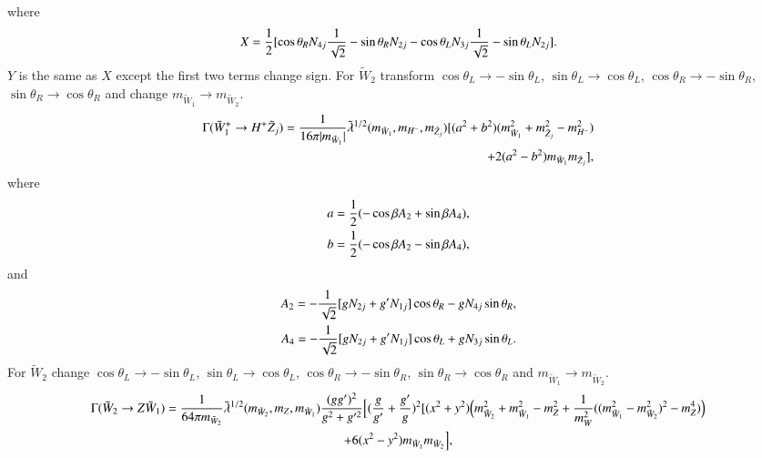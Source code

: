 \documentclass[final,3p,times]{elsarticle}
\begin{document}
where
\begin{equation}
\begin{aligned}
X = {1 \over 2} [\cos\theta_R N_{4j} {1 \over \sqrt{2}} - \sin\theta_R N_{2j} - \cos\theta_L N_{3j} {1 \over \sqrt{2}} - \sin\theta_L N_{2j}].
\end{aligned}
\end{equation}
$Y$ is the same as $X$ except the first two terms change sign.
For $\tilde{W}_2$ transform $\cos\theta_L \rightarrow -\sin\theta_L$, $\sin\theta_L \rightarrow \cos\theta_L$, $\cos\theta_R \rightarrow -\sin\theta_R$, $\sin\theta_R \rightarrow \cos\theta_R$ and change $m_{\tilde{W}_{1}} \rightarrow m_{\tilde{W}_2}$.
\begin{equation}\label{ch1Hpmneut}
\begin{aligned}
\Gamma (\tilde{W}_1^+ \rightarrow H^+ \tilde{Z}_j) = {1 \over 16\pi|m_{\tilde{W}_1}| } \tilde{\lambda}^{1/2} (m_{\tilde{W}_1}, m_{H^-}, m_{\tilde{Z}_j}) [(a^2 + b^2)(m_{\tilde{W}_{1}}^2 + m_{\tilde{Z}_{j}}^2 - m_{H^-}^2) \\ + 2(a^2 - b^2)m_{\tilde{W}_{1}}m_{\tilde{Z}_{j}}],
\end{aligned}
\end{equation} 
where
\begin{equation}
\begin{aligned}
a = {1 \over 2} (-\cos\beta A_2 + \sin\beta A_4), & \\
b = {1 \over 2} (-\cos\beta A_2 - \sin\beta A_4),
\end{aligned}
\end{equation}
and
\begin{equation}
\begin{aligned}
A_2 = -{1 \over \sqrt{2}} [g N_{2j} + g' N_{1j}]\cos\theta_{R} - g N_{4j} \sin\theta_{R},  & \\
A_4 = -{1 \over \sqrt{2}} [g N_{2j} + g' N_{1j}]\cos\theta_{L} + g N_{3j} \sin\theta_{L}.
\end{aligned}
\end{equation}
For $\tilde{W}_2$ change $\cos\theta_L \rightarrow -\sin\theta_L$, $\sin\theta_L \rightarrow \cos\theta_L$, $\cos\theta_R \rightarrow -\sin\theta_R$, $\sin\theta_R \rightarrow \cos\theta_R$ and $m_{\tilde{W}_{1}} \rightarrow m_{\tilde{W}_2}$.
\begin{multline}\label{ch2Zch1}
\Gamma (\tilde{W}_2 \rightarrow Z \tilde{W}_1) = {1 \over 64\pi m_{\tilde{W}_2} } \tilde{\lambda}^{1/2} (m_{\tilde{W}_2}, m_Z, m_{\tilde{W}_1}) {(gg')^2 \over g^2 + g'^2} \Big[({g \over g'} + {g' \over g})^2  [(x^2 + y^2) \Big(m_{\tilde{W}_{2}}^2  + m_{\tilde{W}_{1}}^2 - m_{Z}^2  + {1 \over m_{W}^2}(( m_{\tilde{W}_{1}}^2 - m_{\tilde{W}_{2}}^2)^2 -m_{Z}^4)\Big) \\  +6(x^2 - y^2)m_{\tilde{W}_{1}}m_{\tilde{W}_{2}}\Big] , 
\end{multline} 
\end{document}
